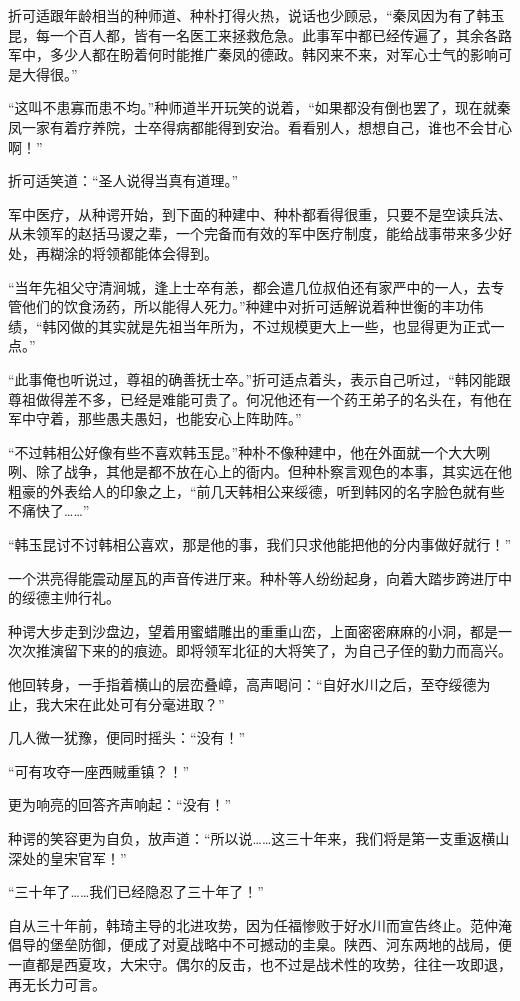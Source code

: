 折可适跟年龄相当的种师道、种朴打得火热，说话也少顾忌，“秦凤因为有了韩玉昆，每一个百人都，皆有一名医工来拯救危急。此事军中都已经传遍了，其余各路军中，多少人都在盼着何时能推广秦凤的德政。韩冈来不来，对军心士气的影响可是大得很。”

“这叫不患寡而患不均。”种师道半开玩笑的说着，“如果都没有倒也罢了，现在就秦凤一家有着疗养院，士卒得病都能得到安治。看看别人，想想自己，谁也不会甘心啊！”

折可适笑道：“圣人说得当真有道理。”

军中医疗，从种谔开始，到下面的种建中、种朴都看得很重，只要不是空读兵法、从未领军的赵括马谡之辈，一个完备而有效的军中医疗制度，能给战事带来多少好处，再糊涂的将领都能体会得到。

“当年先祖父守清涧城，逢上士卒有恙，都会遣几位叔伯还有家严中的一人，去专管他们的饮食汤药，所以能得人死力。”种建中对折可适解说着种世衡的丰功伟绩，“韩冈做的其实就是先祖当年所为，不过规模更大上一些，也显得更为正式一点。”

“此事俺也听说过，尊祖的确善抚士卒。”折可适点着头，表示自己听过，“韩冈能跟尊祖做得差不多，已经是难能可贵了。何况他还有一个药王弟子的名头在，有他在军中守着，那些愚夫愚妇，也能安心上阵助阵。”

“不过韩相公好像有些不喜欢韩玉昆。”种朴不像种建中，他在外面就一个大大咧咧、除了战争，其他是都不放在心上的衙内。但种朴察言观色的本事，其实远在他粗豪的外表给人的印象之上，“前几天韩相公来绥德，听到韩冈的名字脸色就有些不痛快了……”

“韩玉昆讨不讨韩相公喜欢，那是他的事，我们只求他能把他的分内事做好就行！”

一个洪亮得能震动屋瓦的声音传进厅来。种朴等人纷纷起身，向着大踏步跨进厅中的绥德主帅行礼。

种谔大步走到沙盘边，望着用蜜蜡雕出的重重山峦，上面密密麻麻的小洞，都是一次次推演留下来的的痕迹。即将领军北征的大将笑了，为自己子侄的勤力而高兴。

他回转身，一手指着横山的层峦叠嶂，高声喝问：“自好水川之后，至夺绥德为止，我大宋在此处可有分毫进取？”

几人微一犹豫，便同时摇头：“没有！”

“可有攻夺一座西贼重镇？！”

更为响亮的回答齐声响起：“没有！”

种谔的笑容更为自负，放声道：“所以说……这三十年来，我们将是第一支重返横山深处的皇宋官军！”

“三十年了……我们已经隐忍了三十年了！”

自从三十年前，韩琦主导的北进攻势，因为任福惨败于好水川而宣告终止。范仲淹倡导的堡垒防御，便成了对夏战略中不可撼动的圭臬。陕西、河东两地的战局，便一直都是西夏攻，大宋守。偶尔的反击，也不过是战术性的攻势，往往一攻即退，再无长力可言。

